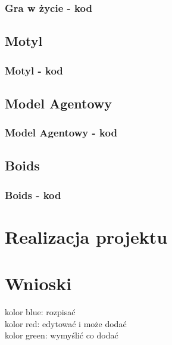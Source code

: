 \documentclass[a4paper,12pt,reqno]{article}
\begin{document}
\subsubsection{Gra w życie - kod}
\subsection{Motyl}
\subsubsection{Motyl - kod}
\subsection{Model Agentowy}
\subsubsection{Model Agentowy - kod}
\subsection{Boids}
\subsubsection{Boids - kod}





\section{Realizacja projektu}

\section{Wnioski}


\newpage




{\color{blue} kolor blue: rozpisać}\\
{\color{red} kolor red: edytować i może dodać}\\
{\color{green} kolor green: wymyślić co dodać}
\end{document}

